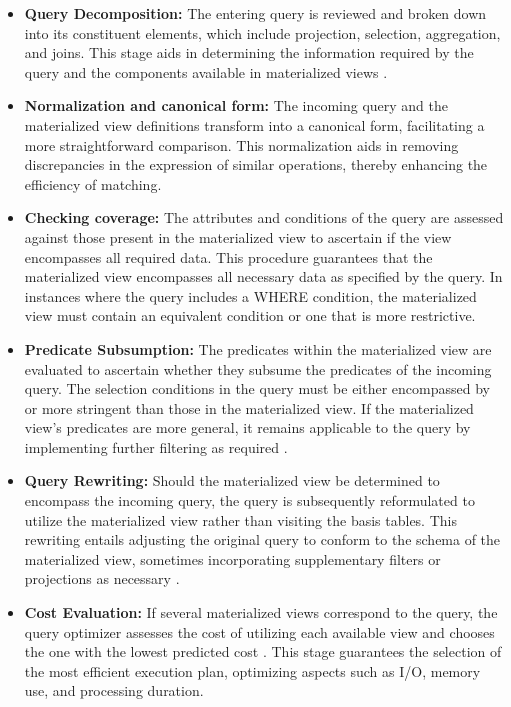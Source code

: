   \begin{itemize}
      \item \textbf{Query Decomposition:} The entering query is reviewed and broken down into its constituent elements, which include projection, selection, aggregation, and joins. This stage aids in determining the information required by the query and the components available in materialized views \cite{theodoratos2000decomposition}.

      \item \textbf{Normalization and canonical form:} The incoming query and the materialized view definitions transform into a canonical form, facilitating a more straightforward comparison. This normalization aids in removing discrepancies in the expression of similar operations, thereby enhancing the efficiency of matching.

     \item \textbf{Checking coverage:} The attributes and conditions of the query are assessed against those present in the materialized view to ascertain if the view encompasses all required data. This procedure guarantees that the materialized view encompasses all necessary data as specified by the query. In instances where the query includes a WHERE condition, the materialized view must contain an equivalent condition or one that is more restrictive.
     
      \item \textbf{Predicate Subsumption:} The predicates within the materialized view are evaluated to ascertain whether they subsume the predicates of the incoming query. The selection conditions in the query must be either encompassed by or more stringent than those in the materialized view. If the materialized view's predicates are more general, it remains applicable to the query by implementing further filtering as required \cite{adali1996query}.

      \item \textbf{Query Rewriting:} Should the materialized view be determined to encompass the incoming query, the query is subsequently reformulated to utilize the materialized view rather than visiting the basis tables. This rewriting entails adjusting the original query to conform to the schema of the materialized view, sometimes incorporating supplementary filters or projections as necessary \cite{haldar2001query}.

         \item \textbf{Cost Evaluation:} If several materialized views correspond to the query, the query optimizer assesses the cost of utilizing each available view and chooses the one with the lowest predicted cost \cite{hulgeri2001cost}.
This stage guarantees the selection of the most efficient execution plan, optimizing aspects such as I/O, memory use, and processing duration.

  \end{itemize}
  

